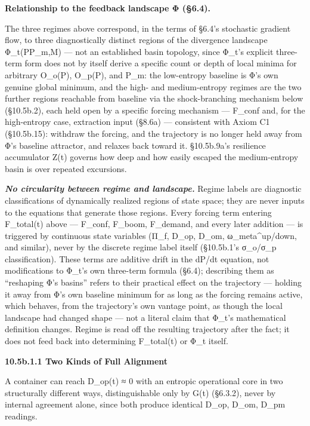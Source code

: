 \documentclass[
]{article}
\begin{document}
\textbf{Relationship to the feedback landscape Φ (§6.4).}

The three regimes above correspond, in the terms of §6.4's stochastic
gradient flow, to three diagnostically distinct regions of the
divergence landscape Φ\_t(P\textbar P\_m,M) --- not an established basin
topology, since Φ\_t's explicit three-term form does not by itself
derive a specific count or depth of local minima for arbitrary O\_o(P),
O\_p(P), and P\_m: the low-entropy baseline is Φ's own genuine global
minimum, and the high- and medium-entropy regimes are the two further
regions reachable from baseline via the shock-branching mechanism below
(§10.5b.2), each held open by a specific forcing mechanism --- F\_conf
and, for the high-entropy case, extraction input (§8.6a) --- consistent
with Axiom C1 (§10.5b.15): withdraw the forcing, and the trajectory is
no longer held away from Φ's baseline attractor, and relaxes back toward
it. §10.5b.9a's resilience accumulator Z(t) governs how deep and how
easily escaped the medium-entropy basin is over repeated excursions.

\emph{\textbf{No circularity between regime and landscape.}} Regime
labels are diagnostic classifications of dynamically realized regions of
state space; they are never inputs to the equations that generate those
regions. Every forcing term entering F\_total(t) above --- F\_conf,
F\_boom, F\_demand, and every later addition --- is triggered by
continuous state variables (Π\_f, D\_op, D\_om, ω\_meta\^{}up/down, and
similar), never by the discrete regime label itself (§10.5b.1's
σ\_o/σ\_p classification). These terms are additive drift in the dP/dt
equation, not modifications to Φ\_t's own three-term formula (§6.4);
describing them as ``reshaping Φ's basins'' refers to their practical
effect on the trajectory --- holding it away from Φ's own baseline
minimum for as long as the forcing remains active, which behaves, from
the trajectory's own vantage point, as though the local landscape had
changed shape --- not a literal claim that Φ\_t's mathematical
definition changes. Regime is read off the resulting trajectory after
the fact; it does not feed back into determining F\_total(t) or Φ\_t
itself.

\textbf{10.5b.1.1 Two Kinds of Full Alignment}

A container can reach D\_op(t) ≈ 0 with an entropic operational core in
two structurally different ways, distinguishable only by G(t) (§6.3.2),
never by internal agreement alone, since both produce identical D\_op,
D\_om, D\_pm readings.
\end{document}

